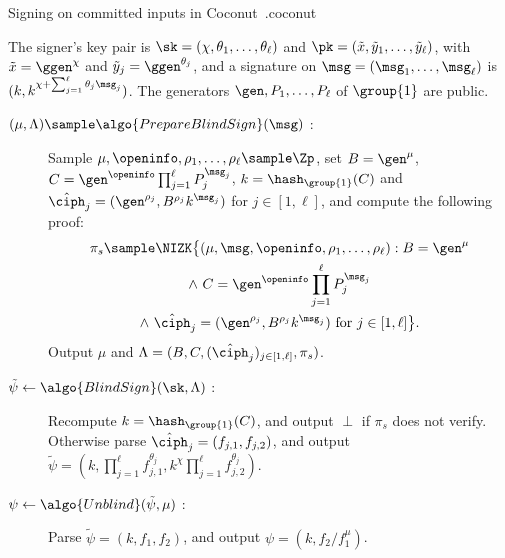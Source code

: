 \begin{primitivebox}{Signing on committed inputs in Coconut~\cite{NDSS:SABMD19}.}{coconut}

  The signer's key pair is $\sk = (\chi, \theta_1, \ldots, \theta_\ell)$ and
$\pk = (\tilde{x}, \tilde{y}_1, \ldots, \tilde{y}_\ell)$, with $\tilde{x} =
\ggen^{\chi}$ and $\tilde{y}_j = \ggen^{\theta_j}$, and a signature on $\msg =
(\msg_1, \ldots, \msg_\ell)$ is $(k, k^{\chi + \sum_{j=1}^{\ell} \theta_j
\msg_j})$. The generators $\gen, P_1, \ldots, P_\ell$ of $\group{1}$ are public.

  \begin{description}

    \item[$(\mu, \Lambda) \sample \algo{PrepareBlindSign}(\msg)$ :] Sample
$\mu, \openinfo, \rho_1, \ldots, \rho_\ell \sample \Zp$, set $B = \gen^{\mu}$,
$C = \gen^{\openinfo} \prod_{j=1}^{\ell} P_j^{\msg_j}$, $k =
\hash_{\group{1}}(C)$ and $\hat{\ciph}_j = (\gen^{\rho_j}, B^{\rho_j}
k^{\msg_j})$ for $j \in [1, \ell]$, and compute the following proof:
          \begin{multline*}
            \pi_s \sample \NIZK\bigl\{(\mu, \msg, \openinfo, \rho_1, \ldots,
\rho_\ell) : B = \gen^{\mu} \\ \wedge\ C = \gen^{\openinfo} \prod_{j=1}^{\ell}
P_j^{\msg_j} \\
            \wedge\ \hat{\ciph}_j = (\gen^{\rho_j}, B^{\rho_j} k^{\msg_j}) \
\text{for } j \in [1, \ell]\bigr\}.
          \end{multline*}
Output $\mu$ and $\Lambda = (B, C, (\hat{\ciph}_j)_{j \in [1, \ell]}, \pi_s)$.

    \item[$\tilde{\psi} \leftarrow \algo{BlindSign}(\sk, \Lambda)$ :]
Recompute $k = \hash_{\group{1}}(C)$, and output $\perp$ if $\pi_s$ does not
verify. Otherwise parse $\hat{\ciph}_j = (f_{j,1}, f_{j,2})$, and output
$\tilde{\psi} = (k, \prod_{j=1}^{\ell} f_{j,1}^{\theta_j}, k^{\chi}
\prod_{j=1}^{\ell} f_{j,2}^{\theta_j})$.

    \item[$\psi \leftarrow \algo{Unblind}(\tilde{\psi}, \mu)$ :] Parse
$\tilde{\psi} = (k, f_1, f_2)$, and output $\psi = (k, f_2 / f_1^{\mu})$.

  \end{description}

\end{primitivebox}


